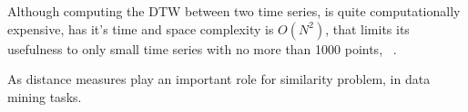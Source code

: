 Although computing the DTW between two time series, is quite computationally expensive, has it's time and space complexity is $O(N^2)$, that limits its usefulness to only small time series with no more than 1000 points, ~\cite{Salvador2007}. 

As distance measures play an important role for similarity problem, in data mining tasks.











